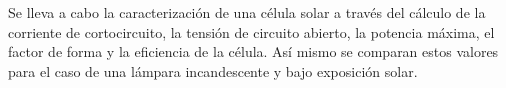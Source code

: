 Se lleva a cabo la caracterización de una célula solar a través del cálculo de la corriente de cortocircuito, la tensión de circuito abierto, la potencia máxima, el factor de forma y la eficiencia de la célula. Así mismo se comparan estos valores para el caso de una lámpara incandescente y bajo exposición solar.
